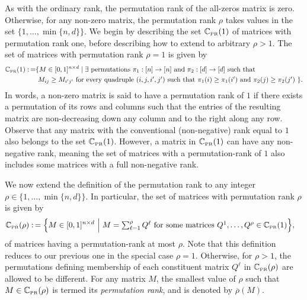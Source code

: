 \documentclass[11pt, hidelinks]{article} %
\newcommand{\defn}{\ensuremath{:\,=}}
\newcommand{\numrows}{n}
\newcommand{\numcols}{d}
\newcommand{\wtmatrix}{M}
\newcommand{\matrixset}{\mathbb{C}}
\newcommand{\permset}{\matrixset_{\mbox{\tiny PR}}}
\newcommand{\permrank}{\rho}
\newcommand{\rankonemx}[1]{Q^{#1}}
\newcommand{\fnpermrank}[1]{\overline{\permrank}(#1)}
\begin{document}
As with the ordinary rank, the permutation rank of the all-zeros
matrix is zero.  Otherwise, for any non-zero matrix, the permutation
rank $\permrank$ takes values in the set $\{1, \ldots, \min\{\numrows,
\numcols\}\}$.  We begin by describing the set $\permset(1)$ of
matrices with permutation rank one, before describing how to extend to
arbitrary $\permrank > 1$. The set of matrices with permutation rank
$\permrank = 1$ is given by
\begin{align*}
\permset(1) \defn & \{ \wtmatrix \in [0,1]^{\numrows \times \numcols} \mid \mbox{$\exists$ permutations $\pi_1:[\numrows] \rightarrow [\numrows]$ and $\pi_2:[\numcols] \rightarrow [\numcols]$ such that}\\
& \mbox{ $\wtmatrix_{ij} \geq \wtmatrix_{i' j'}$ for every quadruple $(i,j , i', j')$ such that $\pi_1(i) \geq \pi_1(i')$ and $\pi_2(j) \geq \pi_2(j')$ } \}.
\end{align*}
In words, a non-zero matrix is said to have a permutation rank of $1$
if there exists a permutation of its rows and columns such that the
entries of the resulting matrix are non-decreasing down any column and
to the right along any row. Observe that any matrix with the
conventional (non-negative) rank equal to $1$ also belongs to the set
$\permset(1)$. However, a matrix in $\permset(1)$ can have any
non-negative rank, meaning the set of matrices with a permutation-rank
of $1$ also includes some matrices with a full non-negative rank.

We now extend the definition of the permutation rank to any integer
$\permrank \in \{1,\ldots,\min\{\numrows, \numcols\}\}$.  In
particular, the set of matrices with permutation rank $\permrank$ is
given by
\begin{align*}
  \permset(\permrank) \defn \Big\{ \wtmatrix \in [0,1]^{\numrows\times
    \numcols} \ \Bigr\rvert \ & \mbox{$\wtmatrix =
    \sum_{\ell=1}^{\permrank} \rankonemx{\ell}$ for some matrices
    $\rankonemx{1},\ldots,\rankonemx{\permrank} \in \permset(1)$}
  \Big\},
\end{align*}
of matrices having a permutation-rank at most $\permrank$. Note that
this definition reduces to our previous one in the special case
$\permrank = 1$.  Otherwise, for $\permrank > 1$, the permutations
defining membership of each constituent matrix $\rankonemx{\ell}$ in
$\permset(\permrank)$ are allowed to be different. For any matrix
$\wtmatrix$, the smallest value of $\permrank$ such that $\wtmatrix
\in \permset(\permrank)$ is termed its \emph{permutation rank}, and is
denoted by $\fnpermrank{\wtmatrix}$.
\end{document}
